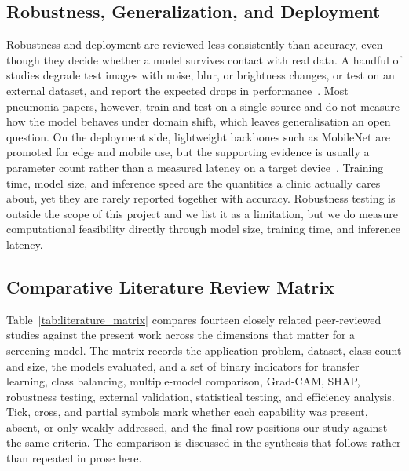 \documentclass[preprint,12pt]{elsarticle}
\begin{document}
\subsection{Robustness, Generalization, and Deployment}
Robustness and deployment are reviewed less consistently than accuracy, even though they decide whether a model survives contact with real data.
A handful of studies degrade test images with noise, blur, or brightness changes, or test on an external dataset, and report the expected drops in performance~\cite{aitnasser2023review,gonzalez2026lung}.
Most pneumonia papers, however, train and test on a single source and do not measure how the model behaves under domain shift, which leaves generalisation an open question.
On the deployment side, lightweight backbones such as MobileNet are promoted for edge and mobile use, but the supporting evidence is usually a parameter count rather than a measured latency on a target device~\cite{alreshan2023mobilenet,albarrak2025tlpneunet}.
Training time, model size, and inference speed are the quantities a clinic actually cares about, yet they are rarely reported together with accuracy.
Robustness testing is outside the scope of this project and we list it as a limitation, but we do measure computational feasibility directly through model size, training time, and inference latency.

\subsection{Comparative Literature Review Matrix}
Table~\ref{tab:literature_matrix} compares fourteen closely related peer-reviewed studies against the present work across the dimensions that matter for a screening model.
The matrix records the application problem, dataset, class count and size, the models evaluated, and a set of binary indicators for transfer learning, class balancing, multiple-model comparison, Grad-CAM, SHAP, robustness testing, external validation, statistical testing, and efficiency analysis.
Tick, cross, and partial symbols mark whether each capability was present, absent, or only weakly addressed, and the final row positions our study against the same criteria.
The comparison is discussed in the synthesis that follows rather than repeated in prose here.
\end{document}

